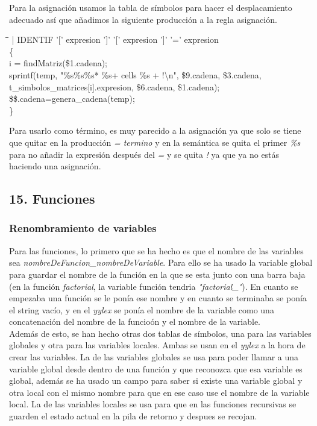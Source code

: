 \documentclass[11pt,spanish]{article}
\begin{document}
		Para la asignación usamos la tabla de símbolos para hacer el desplacamiento adecuado así que añadimos la siguiente producción a la regla asignación.
		\begin{tcolorbox}
		\begin{tabbing}
			\hspace*{1cm}\=\hspace*{0.5cm}\=\hspace*{0.5cm}\=\kill
			| IDENTIF '[' expresion ']' '[' expresion ']' '=' expresion\\
			\>\{   \\
			\>\>i = findMatriz(\$1.cadena);\\
			\>\>sprintf(temp, "\%s\%s\%s* \%s+ cells \%s + !\textbackslash n", \$9.cadena, \$3.cadena,\\
			\>\>\> t\_simbolos\_matrices[i].expresion, \$6.cadena, \$1.cadena);\\
			\>\>\$\$.cadena=genera\_cadena(temp);  \\
			\>\}
		\end{tabbing}
		\end{tcolorbox}
		Para usarlo como término, es muy parecido a la asignación ya que solo se tiene que quitar en la producción \textit{= termino} y en la semántica se quita el primer \textit{\%s} para no añadir la expresión después del \textit{=} y se quita \textit{!} ya que ya no estás haciendo una asignación.
		\subsection*{15. Funciones }
		\label{subsec:15}
		\subsubsection*{Renombramiento de variables}
		Para las funciones, lo primero que se ha hecho es que el nombre de las variables sea \textit{nombreDeFuncion\_nombreDeVariable}. Para ello se ha usado la variable global para guardar el nombre de la función en la que se esta junto con una barra baja (en la función \textit{factorial}, la variable función tendria \textit{"factorial\_"}). En cuanto se empezaba una función se le ponía ese nombre y en cuanto se terminaba se ponía el string vacío, y en el \textit{yylex} se ponía el nombre de la variable como una concatenación del nombre de la funcioón y el nombre de la variable.\\
		Además de esto, se han hecho otras dos tablas de símbolos, una para las variables globales y otra para las variables locales. Ambas se usan en el \textit{yylex} a la hora de crear las variables. La de las variables globales se usa para poder llamar a una variable global desde dentro de una función y que reconozca que esa variable es global, además se ha usado un campo para saber si existe una variable global y otra local con el mismo nombre para que en ese caso use el nombre de la variable local. La de las variables locales se usa para que en las funciones recursivas se guarden el estado actual en la pila de retorno y despues se recojan.
\end{document}
